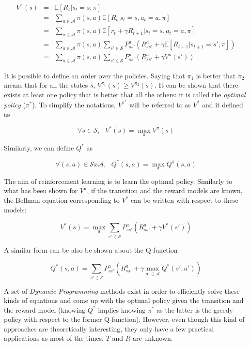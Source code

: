         \begin{eqnarray}
          	V^{\pi} (s)   & = & \mathbb{E} [R_t | s_t = s, \pi] \nonumber \\
           	& = & \sum_{a \in \mathcal{A}} \pi (s,a) \mathbb{E} [R_t | s_t = s, a_t = a, \pi] \nonumber \\
            & = & \sum_{a \in \mathcal{A}} \pi (s,a) \mathbb{E} [r_t + \gamma R_{t+1} | s_t = s, a_t = a, \pi] \nonumber \\
            & = & \sum_{a \in \mathcal{A}} \pi (s,a)  \sum_{s' \in \mathcal{S}} P_{ss'}^a (R_{ss'}^a + \gamma \mathbb{E} [R_{t+1} | s_{t+1} = s', \pi]) \nonumber \\
            & = & \sum_{a \in \mathcal{A}} \pi (s,a)  \sum_{s' \in \mathcal{S}} P_{ss'}^a (R_{ss'}^a + \gamma V^{\pi} (s')) \nonumber
        \end{eqnarray}
            
      	It is possible to define an order over the policies. Saying that $\pi_1$ is better that $\pi_2$ means that for all the states $s$, $V^{\pi_1} (s) \geq V^{\pi_2} (s)$. It can be shown that there exists at least one policy that is better that all the others: it is called the \textit{optimal policy} ($\pi^*$). To simplify the notations, $V^{\pi^*}$ will be referred to as $V^*$ and it defined as
        
        	$$ \forall s \in \mathcal{S}, \text{ } V^* (s) = \max_\pi V^\pi (s) $$
            
       	Similarly, we can define $Q^*$ as
        
        	$$ \forall (s,a) \in \mathcal{S}x\mathcal{A}, \text{ } Q^*(s,a) = \max_\pi Q^{\pi}(s,a) $$

        The aim of reinforcement learning is to learn the optimal policy. Similarly to what has been shown for $V^{\pi}$, if the transition and the reward models are known, the Bellman equation corresponding to $V^*$ can be written with respect to these models:

                $$ V^*(s) = \max_a \sum_{s' \in \mathcal{S}} P_{ss'}^a (R_{ss'}^a + \gamma V^*(s')) $$
        
        A similar form can be also be shown about the Q-function

                $$ Q^*(s,a) = \sum_{s' \in \mathcal{S}} P_{ss'}^a (R_{ss'}^a + \gamma \max_{a' \in \mathcal{A}} Q^*(s',a'))  $$

        A set of \textit{Dynamic Programming} methods exist in order to efficiently solve these kinds of equations and come up with the optimal policy given the transition and the reward model (knowing $Q^*$ implies knowing $\pi^*$ as the latter is the greedy policy with respect to the former Q-function). However, even though this kind of approaches are theoretically interesting, they only have a few practical applications as most of the times, $T$ and $R$ are unknown.
		
